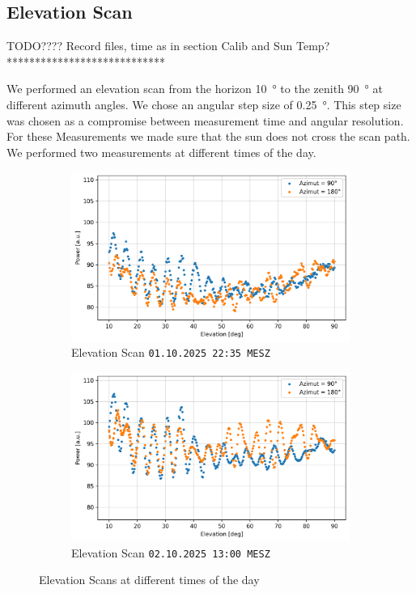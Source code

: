 \subsection{Elevation Scan}
TODO???? Record files, time as in section Calib and Sun Temp? ****************************

We performed an elevation scan from the horizon \SI{10}{\degree} to the zenith \SI{90}{\degree} at different  azimuth angles.
We chose an angular step size of \SI{0.25}{\degree}. This step size was chosen as a compromise between measurement time and angular resolution.
For these Measurements we made sure that the sun does not cross the scan path. We performed two measurements at different times of the day.

\begin{figure}[H]
\centering
\begin{subfigure}[t]{0.45\textwidth}
    \centering
    \includegraphics[width=\linewidth]{assets/elev_scan_night.png}
    \caption{Elevation Scan \texttt{01.10.2025 22:35 MESZ}}
\end{subfigure}
\begin{subfigure}[t]{0.45\textwidth}
    \centering
    \includegraphics[width=\linewidth]{assets/elev_scan_day.png}
    \caption{Elevation Scan \texttt{02.10.2025 13:00 MESZ}}
\end{subfigure}
\caption{Elevation Scans at different times of the day}
\label{fig:elev_scan}
\end{figure}

